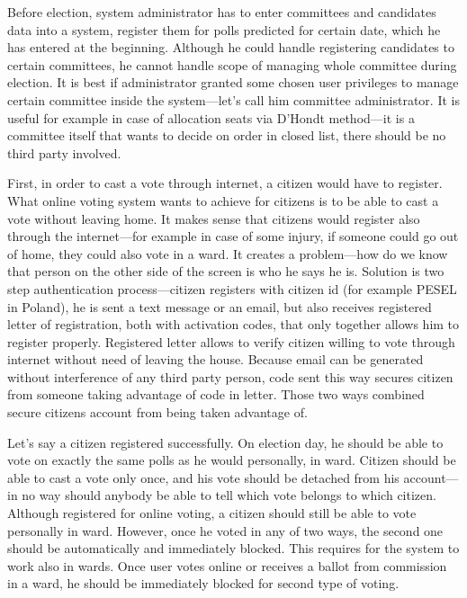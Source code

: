 \documentclass[a4paper,twoside,12pt]{book}
\begin{document}
  Before election, system administrator has to enter committees and candidates data into a system, register them for polls predicted for certain date, which he has entered at the beginning.
  Although he could handle registering candidates to certain committees, he cannot handle scope of managing whole committee during election. 
  It is best if administrator granted some chosen user privileges to manage certain committee inside the system---let's call him committee administrator.
  It is useful for example in case of allocation seats via D'Hondt method---it is a committee itself that wants to decide on order in closed list, there should be no third party involved.
  
  First, in order to cast a vote through internet, a citizen would have to register. What online voting system wants to achieve for citizens is to be able to cast a vote without leaving home.
  It makes sense that citizens would register also through the internet---for example in case of some injury, if someone could go out of home, they could also vote in a ward. 
  It creates a problem---how do we know that person on the other side of the screen is who he says he is. 
  Solution is two step authentication process---citizen registers with citizen id (for example PESEL in Poland), he is sent a text message or an email,
  but also receives registered letter of registration, both with activation codes, that only together allows him to register properly. 
  Registered letter allows to verify citizen willing to vote through internet without need of leaving the house. 
  Because email can be generated without interference of any third party person, code sent this way secures citizen from someone taking advantage of code in letter.
  Those two ways combined secure citizens account from being taken advantage of.

  Let's say a citizen registered successfully. On election day, he should be able to vote on exactly the same polls as he would personally, in ward.
  Citizen should be able to cast a vote only once, and his vote should be detached from his account---in no way should anybody be able to tell which vote belongs to which citizen.
  Although registered for online voting, a citizen should still be able to vote personally in ward. 
  However, once he voted in any of two ways, the second one should be automatically and immediately blocked. This requires for the system to work also in wards.
  Once user votes online or receives a ballot from commission in a ward, he should be immediately blocked for second type of voting.
\end{document}
